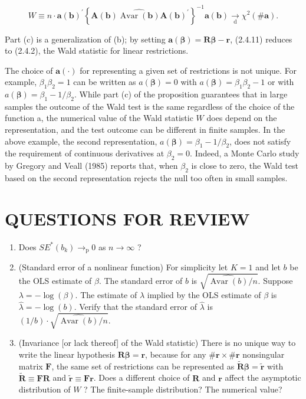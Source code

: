 \documentclass[10pt]{article}
\begin{document}
\begin{equation*}
W \equiv n \cdot \mathbf{a}(\mathbf{b})^{\prime}\left\{\mathbf{A}(\mathbf{b}) \widehat{\operatorname{Avar}(\mathbf{b})} \mathbf{A}(\mathbf{b})^{\prime}\right\}^{-1} \mathbf{a}(\mathbf{b}) \underset{\mathrm{d}}{\rightarrow} \chi^{2}(\# \mathbf{a}) . \tag{2.4.11}
\end{equation*}


Part (c) is a generalization of (b); by setting $\mathbf{a}(\boldsymbol{\beta})=\mathbf{R} \boldsymbol{\beta}-\mathbf{r}$, (2.4.11) reduces to (2.4.2), the Wald statistic for linear restrictions.

The choice of $\mathbf{a}(\cdot)$ for representing a given set of restrictions is not unique. For example, $\beta_{1} \beta_{2}=1$ can be written as $a(\boldsymbol{\beta})=0$ with $a(\boldsymbol{\beta})=\beta_{1} \beta_{2}-1$ or with $a(\boldsymbol{\beta})=\beta_{1}-1 / \beta_{2}$. While part (c) of the proposition guarantees that in large samples the outcome of the Wald test is the same regardless of the choice of the function a, the numerical value of the Wald statistic $W$ does depend on the representation, and the test outcome can be different in finite samples. In the above example, the second representation, $a(\boldsymbol{\beta})=\beta_{1}-1 / \beta_{2}$, does not satisfy the requirement of continuous derivatives at $\beta_{2}=0$. Indeed, a Monte Carlo study by Gregory and Veall (1985) reports that, when $\beta_{2}$ is close to zero, the Wald test based on the second representation rejects the null too often in small samples.

\section*{QUESTIONS FOR REVIEW}
\begin{enumerate}
  \item Does $S E^{*}\left(b_{k}\right) \rightarrow_{\mathrm{p}} 0$ as $n \rightarrow \infty$ ?
  \item (Standard error of a nonlinear function) For simplicity let $K=1$ and let $b$ be the OLS estimate of $\beta$. The standard error of $b$ is $\sqrt{\widehat{\operatorname{Avar}(b)} / n}$. Suppose $\lambda= -\log (\beta)$. The estimate of $\lambda$ implied by the OLS estimate of $\beta$ is $\hat{\lambda}=-\log (b)$. Verify that the standard error of $\hat{\lambda}$ is $(1 / b) \cdot \sqrt{\widehat{\operatorname{Avar}(b)} / n}$.
  \item (Invariance [or lack thereof] of the Wald statistic) There is no unique way to write the linear hypothesis $\mathbf{R} \boldsymbol{\beta}=\mathbf{r}$, because for any $\# \mathbf{r} \times \# \mathbf{r}$ nonsingular matrix $\mathbf{F}$, the same set of restrictions can be represented as $\widetilde{\mathbf{R}} \boldsymbol{\beta}=\widetilde{\mathbf{r}}$ with $\widetilde{\mathbf{R}} \equiv \mathbf{F R}$ and $\widetilde{\mathbf{r}} \equiv \mathbf{F r}$. Does a different choice of $\mathbf{R}$ and $\mathbf{r}$ affect the asymptotic distribution of $W$ ? The finite-sample distribution? The numerical value?
\end{enumerate}
\end{document}
